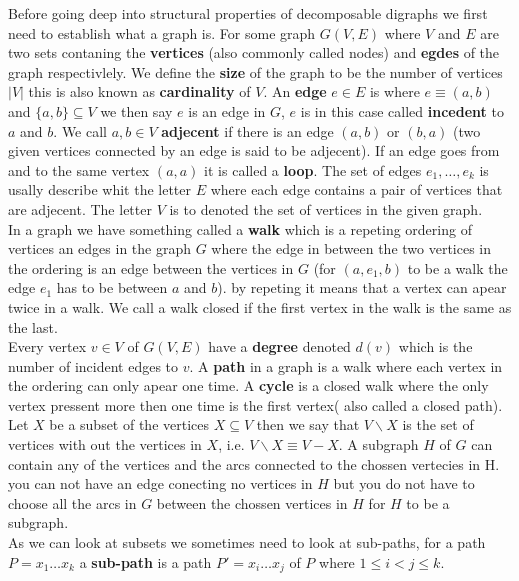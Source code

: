 Before going deep into structural properties of decomposable digraphs we first need to establish what a graph is.
For some graph $G(V,E)$ where $V$ and $E$ are two sets contaning the \textbf{vertices} (also commonly called nodes) and \textbf{egdes} of the graph respectivlely.
We define the \textbf{size} of the graph to be the number of vertices $|V|$ this is also known as \textbf{cardinality} of $V$.
An \textbf{edge} $e \in E$ is where $e \equiv (a, b)$ and $\{ a, b \} \subseteq V$ we then say $e$ is an edge in $G$, $e$ is in this case called \textbf{incedent} to $a$ and $b$. 
We call $a,b \in V$ \textbf{adjecent} if there is an edge $(a,b)$ or $(b,a)$ (two given vertices connected by an edge is said to be adjecent).
If an edge goes from and to the same vertex $(a,a)$ it is called a \textbf{loop}.
The set of edges $e_1, \dots, e_k$ is usally describe whit the letter $E$ where each edge contains a pair of vertices that are adjecent. The letter $V$ is to denoted the set of vertices in the given graph. \\
In a graph we have something called a \textbf{walk} which is a repeting ordering of vertices an edges in the graph $G$ where the edge in between the two vertices in the ordering is an edge between the vertices in $G$ (for $(a,e_1,b)$ to be a walk the edge $e_1$ has to be between $a$ and $b$). by repeting it means that a vertex can apear twice in a walk.
We call a walk closed if the first vertex in the walk is the same as the last.\\
Every vertex $v\in V$ of $G(V,E)$ have a \textbf{degree} denoted $d(v)$ which is the number of incident edges to $v$.
A \textbf{path} in a graph is a walk where each vertex in the ordering can only apear one time. 
A \textbf{cycle} is a closed walk where the only vertex pressent more then one time is the first vertex( also called a closed path). 
Let $X$ be a subset of the vertices $X\subseteq V$ then we say that $V\backslash X$ is the set of vertices with out the vertices in $X$, i.e. $V\backslash X \equiv V-X$. 
A subgraph $H$ of $G$ can contain any of the vertices and the arcs connected to the chossen vertecies in H. 
you can not have an edge conecting no vertices in $H$ but you do not have to choose all the arcs in $G$ between the chossen vertices in $H$ for $H$ to be a subgraph. \\
As we can look at subsets we sometimes need to look at sub-paths, for a path $P=x_1\dots x_k$ a \textbf{sub-path} is a path $P'=x_i\dots x_j$ of $P$ where $1\leq i < j \leq k$.
